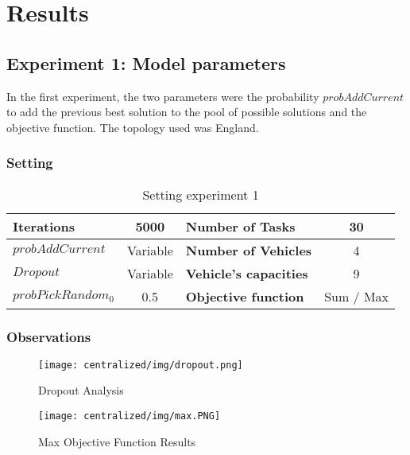 \documentclass[11pt]{article}
\begin{document}
\section{Results}

\subsection{Experiment 1: Model parameters}
In the first experiment, the two parameters were the probability $probAddCurrent$ to add the previous best solution to the pool of possible solutions and the objective function. The topology used was England.

\subsubsection{Setting}

\begin{table}[H]
\centering
\begin{tabular}{|l|c||l|c|}
\hline
\textbf{Iterations}         & 5000      & \textbf{Number of Tasks}      & 30      \\ \hline
\textbf{$probAddCurrent$}   & Variable  & \textbf{Number of Vehicles}   & 4       \\ \hline
\textbf{$Dropout$} & Variable & \textbf{Vehicle's capacities} & 9       \\ \hline
\textbf{$probPickRandom_0$}   & 0.5  & \textbf{Objective function}             & Sum / Max \\ \hline
\end{tabular}
\caption{Setting experiment 1}
\end{table}

\subsubsection{Observations}

\begin{figure}[H]
	\centering
	\begin{minipage}{0.49\linewidth}
    	\centering
    	\texttt{[image: centralized/img/dropout.png]}
    	\caption{Dropout Analysis}
        \label{fig:dropout}
	\end{minipage}
	\begin{minipage}{0.49\linewidth}
    	\centering
    	\texttt{[image: centralized/img/max.PNG]}
    	\caption{Max Objective Function Results}
        \label{fig:max}
	\end{minipage}
\end{figure}
\end{document}
